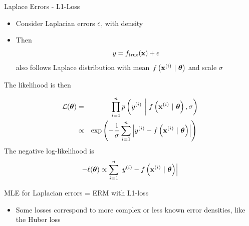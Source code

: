 \documentclass[11pt,compress,t,notes=noshow, xcolor=table]{beamer}
\begin{document}
\begin{vbframe}{Laplace Errors - L1-Loss}

\begin{itemize}
    \item Consider Laplacian errors $\epsilon$, with density 
\end{itemize}
\lz

\begin{itemize}
\item Then
$$
y = f_{\text{true}}(\mathbf{x}) + \epsilon 
$$
also follows Laplace distribution with mean $f\left(\mathbf{x}^{(i)} ~|~ \bm{\theta}\right)$ and scale  $\sigma$ 
\end{itemize}
\framebreak 

The likelihood is then 

\begin{eqnarray*}
\mathcal{L}(\bm{\theta}) &=& \prod_{i=1}^n p\left(y^{(i)} ~\bigg|~ f\left(\mathbf{x}^{(i)} ~|~ \bm{\theta}\right), \sigma\right) \\ &\propto& \exp\left(-\frac{1}{\sigma}\sum\limits_{i=1}^n \left|y^{(i)} - f\left(\mathbf{x}^{(i)} ~|~ \bm{\theta}\right)\right|\right)\,
\end{eqnarray*}
The negative log-likelihood is
$$
- \ell(\bm{\theta}) \propto \sum\limits_{i=1}^n \left|y^{(i)} - f\left(\mathbf{x}^{(i)} ~|~ \bm{\theta}\right)\right|
$$

MLE for Laplacian errors = ERM with L1-loss 

\begin{itemize}
\item Some losses correspond to more complex or less known error densities, like the Huber loss 


\end{itemize}
\end{vbframe}
\end{document}
